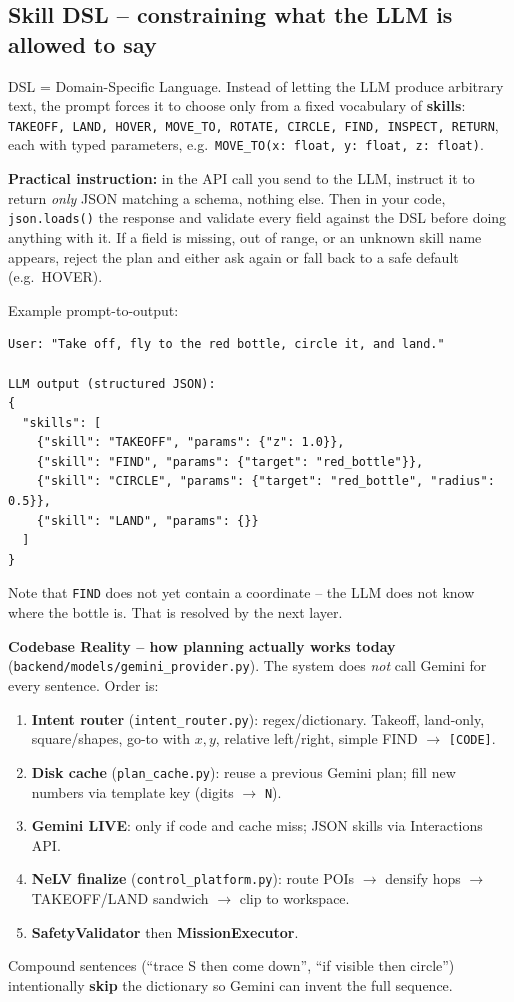 \documentclass[11pt,a4paper]{article}
\begin{document}
\subsection{Skill DSL -- constraining what the LLM is allowed to say}
DSL = Domain-Specific Language. Instead of letting the LLM produce arbitrary text, the prompt
forces it to choose only from a fixed vocabulary of \textbf{skills}:
\texttt{TAKEOFF, LAND, HOVER, MOVE\_TO, ROTATE, CIRCLE, FIND, INSPECT, RETURN}, each with typed
parameters, e.g.\ \texttt{MOVE\_TO(x: float, y: float, z: float)}.

\begin{quotebox}
\textbf{Practical instruction:} in the API call you send to the LLM, instruct it to return
\emph{only} JSON matching a schema, nothing else. Then in your code, \texttt{json.loads()} the
response and validate every field against the DSL before doing anything with it. If a field is
missing, out of range, or an unknown skill name appears, reject the plan and either ask again or
fall back to a safe default (e.g.\ HOVER).
\end{quotebox}

Example prompt-to-output:
\begin{verbatim}
User: "Take off, fly to the red bottle, circle it, and land."

LLM output (structured JSON):
{
  "skills": [
    {"skill": "TAKEOFF", "params": {"z": 1.0}},
    {"skill": "FIND", "params": {"target": "red_bottle"}},
    {"skill": "CIRCLE", "params": {"target": "red_bottle", "radius": 0.5}},
    {"skill": "LAND", "params": {}}
  ]
}
\end{verbatim}

Note that \texttt{FIND} does not yet contain a coordinate -- the LLM does not know where the
bottle is. That is resolved by the next layer.

\begin{quotebox}
\textbf{Codebase Reality -- how planning actually works today}
(\texttt{backend/models/gemini\_provider.py}).
The system does \emph{not} call Gemini for every sentence. Order is:
\begin{enumerate}[itemsep=2pt]
\item \textbf{Intent router} (\texttt{intent\_router.py}): regex/dictionary. Takeoff, land-only,
square/shapes, go-to with $x,y$, relative left/right, simple FIND $\to$ \texttt{[CODE]}.
\item \textbf{Disk cache} (\texttt{plan\_cache.py}): reuse a previous Gemini plan; fill new
numbers via template key (digits $\to$ \texttt{N}).
\item \textbf{Gemini LIVE}: only if code and cache miss; JSON skills via Interactions API.
\item \textbf{NeLV finalize} (\texttt{control\_platform.py}): route POIs $\to$ densify hops
$\to$ TAKEOFF/LAND sandwich $\to$ clip to workspace.
\item \textbf{SafetyValidator} then \textbf{MissionExecutor}.
\end{enumerate}
Compound sentences (``trace S then come down'', ``if visible then circle'') intentionally
\textbf{skip} the dictionary so Gemini can invent the full sequence.
\end{quotebox}
\end{document}
